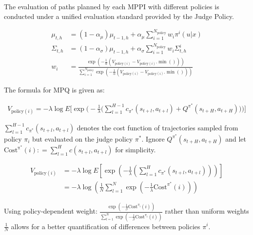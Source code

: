 \documentclass{article}
\begin{document}
The evaluation of paths planned by each MPPI with different policies is conducted under a unified evaluation standard provided by the Judge Policy. 

\begin{align}
	{\mu _{t,h}} & = (1 - {\alpha _\mu }){\mu _{t - 1,h}} + {\alpha _\mu }\sum\nolimits_{i = 1}^{{N_{\text{policy}}}} {w_i}{\pi ^i}(u|x) \tag{1}\\
	{\Sigma _{t,h}} & = (1 - {\alpha _\sigma }){\mu _{t - 1,h}} + {\alpha _\sigma }\sum\nolimits_{i = 1}^{{N_{\text{policy}}}} {w_i}\Sigma _{t,h}^i \tag{2}\\
	{w_i} & = \frac{{\exp ( - \frac{1}{\alpha }({V_{\text{policy}(i)}} - {V_{\text{policy}(i)}}.\min ()))}}{{\sum\nolimits_{i = 1}^{{N_{\text{policy}}}} {\exp ( - \frac{1}{\alpha }({V_{\text{policy}(i)}} - {V_{\text{policy}(i)}}.\min ()))} }} \tag{3}
\end{align}

The formula for MPQ is given as:

\begin{align}
 {V_{\text{policy}(i)}}  = -\lambda {\log} E\bigg[ \exp \bigg( -\frac{1}{\lambda} \Big( \sum_{l=1}^{H-1} {c_{\pi^*}}({s_{t + l}},{a_{t + l}})+ {Q^{\pi^*}}({s_{t + H}},{a_{t + H}}) \Big) \bigg) \bigg] \tag{4}
\end{align}

$\sum\nolimits_{l = 1}^{H - 1} {{c_{\pi^*}}} \left( {{s_{t + l}},{a_{t + l}}} \right)$ denotes the cost function of trajectories sampled from policy ${\pi _i}$ but evaluated on the judge policy \(\pi^*\). Ignore ${Q^{\pi^*}}\left( {{s_{t + H}},{a_{t + H}}} \right)$ and let
$\mathrm{Cost^{\pi^*}}(i): = \sum\nolimits_{l = 1}^H c \left( {{s_{t + l}},{a_{t + l}}} \right)$ for simplicity.

\begin{align}
	\nonumber {V_{\text{policy}(i)}} & =  - \lambda {\log} E\left[ {\exp \left( { -\frac{1}{\lambda}\left( {\sum\nolimits_{l = 1}^H {{c_{\pi^*}}\left( {{s_{t + l}},{a_{t + l}}} \right)} } \right)} \right)} \right] \\
	& = - \lambda{\log} \left( \frac{1}{N }\sum\nolimits_{l = 1}^N {\exp } \left( -
	\frac{1}{\lambda}{\mathrm{Cost}^{\pi^*}}(i) \right) \right) \tag{5}
\end{align}



Using policy-dependent weight:
$
\frac{\exp\left(-\frac{1}{\beta}\text{Cost}^{\pi_i}(i)\right)}
{\sum_{l=1}^N \exp\left(-\frac{1}{\beta}\text{Cost}^{\pi_i}(i)\right)}
$
rather than uniform weights $\frac{1}{N}$ allows for a better quantification of differences between policies $\pi^i$.
\end{document}
